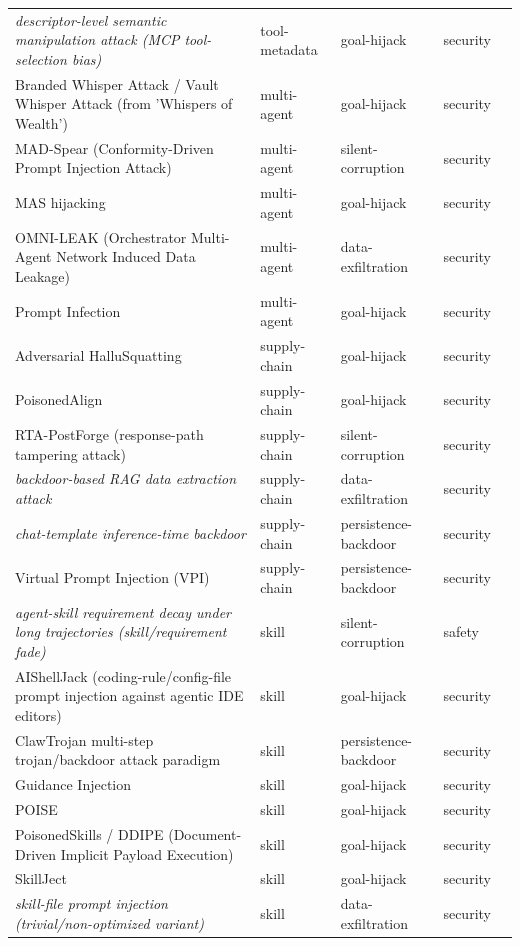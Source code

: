 \begin{longtable}{@{}>{\raggedright\arraybackslash}p{}llll@{}}
\emph{descriptor-level semantic manipulation attack (MCP tool-selection bias)} & tool-metadata & goal-hijack & security & \cite{jamshidi-2025-semantic} \\
Branded Whisper Attack / Vault Whisper Attack (from 'Whispers of Wealth') & multi-agent & goal-hijack & security & \cite{debi-2026-whispers} \\
MAD-Spear (Conformity-Driven Prompt Injection Attack) & multi-agent & silent-corruption & security & \cite{cui-2025-madspear} \\
MAS hijacking & multi-agent & goal-hijack & security & \cite{triedman-2025-multiagent} \\
OMNI-LEAK (Orchestrator Multi-Agent Network Induced Data Leakage) & multi-agent & data-exfiltration & security & \cite{naik-2026-omnileak} \\
Prompt Infection & multi-agent & goal-hijack & security & \cite{lee-2025-prompt} \\
Adversarial HalluSquatting & supply-chain & goal-hijack & security & \cite{spira-2026-beware} \\
PoisonedAlign & supply-chain & goal-hijack & security & \cite{shao-2024-enhancing} \\
RTA-PostForge (response-path tampering attack) & supply-chain & silent-corruption & security & \cite{luo-2026-rewriting} \\
\emph{backdoor-based RAG data extraction attack} & supply-chain & data-exfiltration & security & \cite{peng-2024-data} \\
\emph{chat-template inference-time backdoor} & supply-chain & persistence-backdoor & security & \cite{fogel-2026-inferencetime} \\
Virtual Prompt Injection (VPI) & supply-chain & persistence-backdoor & security & \cite{yan-2023-backdooring} \\
\emph{agent-skill requirement decay under long trajectories (skill/requirement fade)} & skill & silent-corruption & safety & \cite{xue-2026-agent} \\
AIShellJack (coding-rule/config-file prompt injection against agentic IDE editors) & skill & goal-hijack & security & \cite{liu-2025-your} \\
ClawTrojan multi-step trojan/backdoor attack paradigm & skill & persistence-backdoor & security & \cite{tan-2026-prompt} \\
Guidance Injection & skill & goal-hijack & security & \cite{liu-2026-trojan} \\
POISE & skill & goal-hijack & security & \cite{hao-2026-poise} \\
PoisonedSkills / DDIPE (Document-Driven Implicit Payload Execution) & skill & goal-hijack & security & \cite{qu-2026-supplychain} \\
SkillJect & skill & goal-hijack & security & \cite{jia-2026-skillject} \\
\emph{skill-file prompt injection (trivial/non-optimized variant)} & skill & data-exfiltration & security & \cite{schmotz-2025-agent} \\
\end{longtable}
\endgroup
